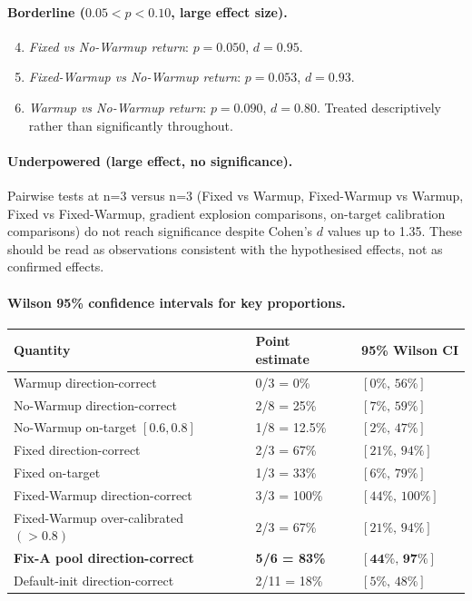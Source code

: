 \documentclass[10pt,a4paper]{article}
\begin{document}
\paragraph{Borderline ($0.05<p<0.10$, large effect size).}
\begin{enumerate}
  \setcounter{enumi}{3}
  \item \emph{Fixed vs No-Warmup return}: $p=0.050$, $d=0.95$.
  \item \emph{Fixed-Warmup vs No-Warmup return}: $p=0.053$, $d=0.93$.
  \item \emph{Warmup vs No-Warmup return}: $p=0.090$, $d=0.80$.
        Treated descriptively rather than significantly throughout.
\end{enumerate}

\paragraph{Underpowered (large effect, no significance).}
Pairwise tests at n=3 versus n=3 (Fixed vs Warmup, Fixed-Warmup vs Warmup,
Fixed vs Fixed-Warmup, gradient explosion comparisons, on-target calibration
comparisons) do not reach significance despite Cohen's $d$ values up to 1.35.
These should be read as observations consistent with the hypothesised effects,
not as confirmed effects.

\paragraph{Wilson 95\% confidence intervals for key proportions.}

\begin{center}
\setlength{\tabcolsep}{8pt}
\begin{tabular}{lll}
\toprule
Quantity & Point estimate & 95\% Wilson CI \\
\midrule
Warmup direction-correct                & 0/3 = 0\%    & $[0\%,\,56\%]$ \\
No-Warmup direction-correct             & 2/8 = 25\%   & $[7\%,\,59\%]$ \\
No-Warmup on-target $[0.6,0.8]$         & 1/8 = 12.5\% & $[2\%,\,47\%]$ \\
Fixed direction-correct                 & 2/3 = 67\%   & $[21\%,\,94\%]$ \\
Fixed on-target                         & 1/3 = 33\%   & $[6\%,\,79\%]$ \\
Fixed-Warmup direction-correct          & 3/3 = 100\%  & $[44\%,\,100\%]$ \\
Fixed-Warmup over-calibrated $({>}0.8)$ & 2/3 = 67\%   & $[21\%,\,94\%]$ \\
\textbf{Fix-A pool direction-correct}   & \textbf{5/6 = 83\%} & $\mathbf{[44\%,\,97\%]}$ \\
Default-init direction-correct          & 2/11 = 18\%  & $[5\%,\,48\%]$ \\
\bottomrule
\end{tabular}
\end{center}
\end{document}
